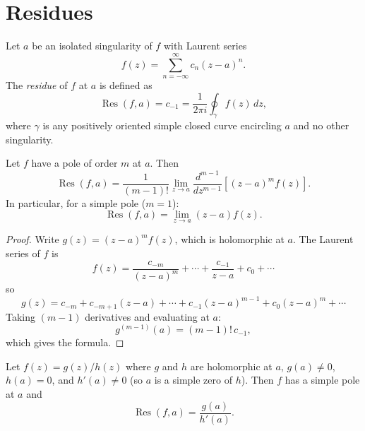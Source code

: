 \section{Residues}

\begin{definition}[Residue]
  Let $a$ be an isolated singularity of $f$ with Laurent series
  \[
    f(z) = \sum_{n=-\infty}^{\infty} c_n (z - a)^n.
  \]
  The \emph{residue} of $f$ at $a$ is defined as
  \begin{equation}
    \operatorname{Res}(f, a) = c_{-1} = \frac{1}{2\pi i} \oint_{\gamma} f(z) \, dz,
  \end{equation}
  where $\gamma$ is any positively oriented simple closed curve encircling $a$ and no other singularity.
\end{definition}

\begin{theorem}
  Let $f$ have a pole of order $m$ at $a$. Then
  \begin{equation}
    \operatorname{Res}(f, a) = \frac{1}{(m-1)!} \lim_{z \to a} \frac{d^{m-1}}{dz^{m-1}} \left[ (z - a)^m f(z) \right].
  \end{equation}
  In particular, for a simple pole ($m = 1$):
  \begin{equation}
    \operatorname{Res}(f, a) = \lim_{z \to a} (z - a) f(z).
  \end{equation}
\end{theorem}

\begin{proof}
  Write $g(z) = (z - a)^m f(z)$, which is holomorphic at $a$. The Laurent series of $f$ is
  \[
    f(z) = \frac{c_{-m}}{(z-a)^m} + \cdots + \frac{c_{-1}}{z-a} + c_0 + \cdots
  \]
  so
  \[
    g(z) = c_{-m} + c_{-m+1}(z-a) + \cdots + c_{-1}(z-a)^{m-1} + c_0(z-a)^m + \cdots
  \]
  Taking $(m-1)$ derivatives and evaluating at $a$:
  \[
    g^{(m-1)}(a) = (m-1)! \, c_{-1},
  \]
  which gives the formula.
\end{proof}

\begin{proposition}
  Let $f(z) = g(z)/h(z)$ where $g$ and $h$ are holomorphic at $a$, $g(a) \neq 0$, $h(a) = 0$, and $h'(a) \neq 0$ (so $a$ is a simple zero of $h$). Then $f$ has a simple pole at $a$ and
  \begin{equation}
    \operatorname{Res}(f, a) = \frac{g(a)}{h'(a)}.
  \end{equation}
\end{proposition}

